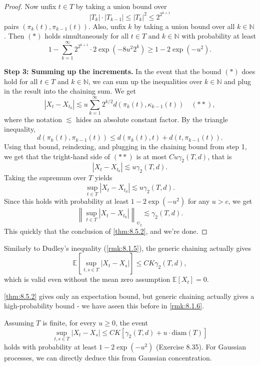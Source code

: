 \begin{proof}
Now unfix $t \in T$ by taking a union bound over 
\[ |T_k| \cdot |T_{k - 1}| \leq |T_k|^2 \leq 2^{2^{k + 1}} \]
pairs $(\pi_k(t), \pi_{k - 1}(t))$. Also, unfix $k$ by taking a union bound over all $k \in \mathbb{N}$. Then 
$(*)$ holds simultaneously for all $t \in T$ and $k \in \mathbb{N}$ with probability at least 
\[ 1 - \sum_{k = 1}^{\infty} 2^{2^{k + 1}} \cdot 2 \exp{(-8u^2 2^k)} \geq 1 - 2 \exp{(-u^2)}. \]

\textbf{Step 3: Summing up the increments.} In the event that the bound $(*)$ does hold for all $t \in T$ and 
$k \in \mathbb{N}$, we can sum up the inequalities over $k \in \mathbb{N}$ and plug in the result into the 
chaining sum. We get 
\[ |X_t - X_{t_0}| \lesssim u \sum_{k = 1}^{\infty} 2^{k/2} d(\pi_k(t), \kappa_{k - 1}(t)) \quad (**), \]
where the notation $\lesssim$ hides an absolute constant factor. By the triangle inequality, 
\[ d(\pi_k(t), \pi_{k - 1}(t)) \leq d(\pi_k(t), t) + d(t, \pi_{k - 1}(t)). \]
Using that bound, reindexing, and plugging in the chaining bound from step 1, we get that the tright-hand side 
of $(**)$ is at most $Cu \gamma_2(T, d)$, that is 
\[ |X_t - X_{t_0}| \lesssim u \gamma_2(T, d). \]
Taking the supremum over $T$ yields 
\[ \sup_{t \in T}|X_t - X_{t_0}| \lesssim u \gamma_2(T, d). \]
Since this holds with probability at least $1 - 2 \exp{(-u^2)}$ for any $u > c$, we get 
\[ \left\lVert \sup_{t \in T}|X_t - X_{t_0}| \right\rVert_{\psi_2} \lesssim \gamma_2(T, d). \]
This quickly that the conclusion of \cref{thm:8.5.2}, and we're done.
\end{proof}

\begin{remark}
\label{rmk:8.5.3}
Similarly to Dudley's inequality (\cref{rmk:8.1.5}), the generic chaining actually gives 
\[ \mathbb{E}\left[ \sup_{t, s \in T}|X_t - X_s| \right] \leq CK \gamma_2(T, d), \]
which is valid even without the mean zero assumption $\mathbb{E}\left[ X_t \right] = 0$.
\end{remark}

\begin{remark}
\label{rmk:8.5.4}
\cref{thm:8.5.2} gives only an expectation bound, but generic chaining actually gives a high-probability bound - 
we have aseen this before in \cref{rmk:8.1.6}.

Assuming $T$ is finite, for every $u \geq 0$, the event 
\[ \sup_{t, s \in T}|X_t - X_s| \leq CK \left[ \gamma_2(T, d) + u \cdot \mathrm{diam}(T) \right] \]
holds with probability at least $1 - 2 \exp{(-u^2)}$ (Exercise 8.35). For Gaussian processes, we can directly 
deduce this from Gaussian concentration.
\end{remark}


